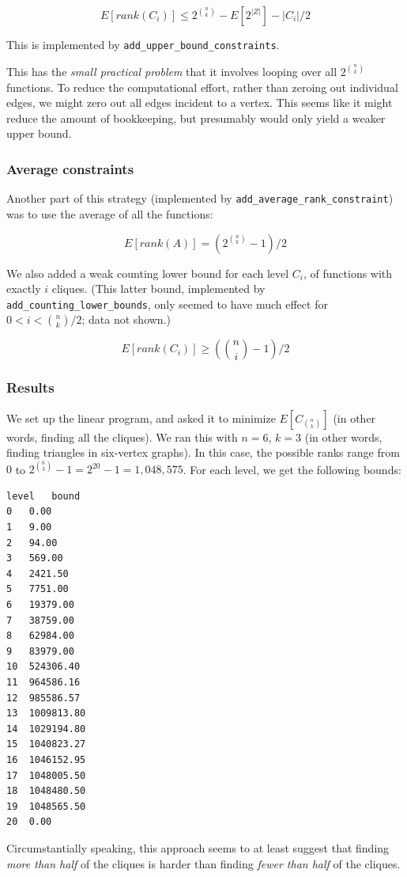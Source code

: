 \documentclass[12pt]{article}
\theoremstyle{definition}
\begin{document}
\[
E[rank(C_i)] \le 2^{n \choose k} - E[2^{|Z|}] - |C_i|/2
\]

This is implemented by {\tt add\_upper\_bound\_constraints}.

This has the {\em small practical problem} that it involves
looping over all $2^{n \choose k}$ functions. To reduce the computational
effort, rather than zeroing out individual edges,
we might zero out all edges incident to a vertex. This seems like it might reduce
the amount of bookkeeping, but presumably would only yield a weaker upper bound.

\subsubsection{Average constraints}

Another part of this strategy 
(implemented by {\tt add\_average\_rank\_constraint}) was
to use the average of all the functions:

\[
E[rank(A)] = (2^{n \choose k} - 1) / 2
\]

We also added a weak counting lower bound for each level $C_i$, of functions
with exactly $i$ cliques. (This latter bound, implemented by
{\tt add\_counting\_lower\_bounds}, only seemed to have much
effect for $0 < i < {n \choose k}/2$; data not shown.)

\[
E[rank(C_i)] \ge ({n \choose i} - 1) / 2
\]

\subsubsection{Results}

We set up the linear program, and asked it to minimize $E[C_{n \choose k}]$
(in other words, finding all the cliques). We ran this with $n=6$, $k=3$
(in other words, finding triangles in six-vertex graphs). In this case,
the possible ranks range from $0$ to $2^{6 \choose 3}-1 = 2^{20}-1 = 1,048,575$.
For each level, we get the following bounds:

\begin{verbatim}
level	bound
0	0.00
1	9.00
2	94.00
3	569.00
4	2421.50
5	7751.00
6	19379.00
7	38759.00
8	62984.00
9	83979.00
10	524306.40
11	964586.16
12	985586.57
13	1009813.80
14	1029194.80
15	1040823.27
16	1046152.95
17	1048005.50
18	1048480.50
19	1048565.50
20	0.00
\end{verbatim}

Circumstantially speaking, this approach seems to at least suggest
that finding {\em more than half} of the cliques is harder than finding
{\em fewer than half} of the cliques.
\end{document}

